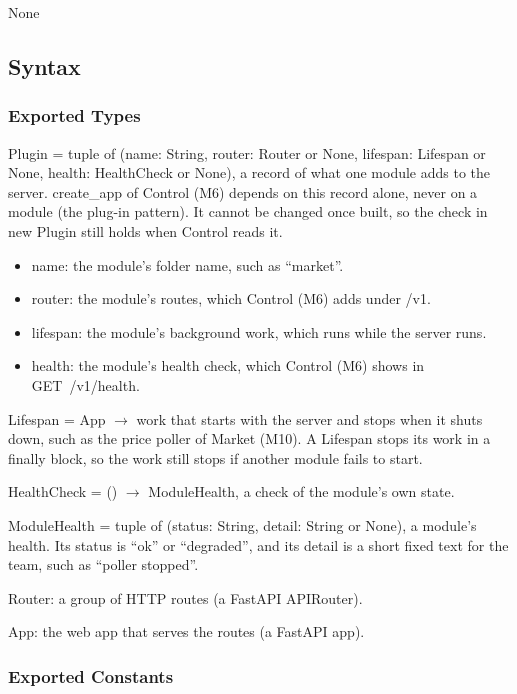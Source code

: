 \documentclass[12pt, titlepage]{article}
\begin{document}
None

\subsection{Syntax}

\subsubsection{Exported Types}

\noindent Plugin = tuple of (name: String, router: Router or None, lifespan:
Lifespan or None, health: HealthCheck or None), a record of what one module adds
to the server. create\_app of Control (M6) depends on this record alone, never
on a module (the plug-in pattern). It cannot be changed once built, so the
check in new Plugin still holds when Control reads it.
\begin{itemize}
\item name: the module's folder name, such as ``market''.
\item router: the module's routes, which Control (M6) adds under /v1.
\item lifespan: the module's background work, which runs while the server runs.
\item health: the module's health check, which Control (M6) shows in
  GET~/v1/health.
\end{itemize}

\noindent Lifespan = App $\rightarrow$ work that starts with the server and
stops when it shuts down, such as the price poller of Market (M10). A Lifespan
stops its work in a finally block, so the work still stops if another module
fails to start.

\medskip
\noindent HealthCheck = () $\rightarrow$ ModuleHealth, a check of the
module's own state.

\medskip
\noindent ModuleHealth = tuple of (status: String, detail: String or None), a
module's health. Its status is ``ok'' or \mbox{``degraded''}, and its detail is a
short fixed text for the team, such as ``poller stopped''.

\medskip
\noindent Router: a group of HTTP routes (a FastAPI APIRouter).

\medskip
\noindent App: the web app that serves the routes (a FastAPI app).

\subsubsection{Exported Constants}
\end{document}

